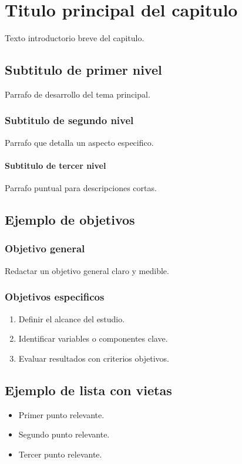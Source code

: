 
\chapter{Titulo principal del capitulo}
Texto introductorio breve del capitulo.

\section{Subtitulo de primer nivel}
Parrafo de desarrollo del tema principal.

\subsection{Subtitulo de segundo nivel}
Parrafo que detalla un aspecto especifico.

\subsubsection{Subtitulo de tercer nivel}
Parrafo puntual para descripciones cortas.

\section{Ejemplo de objetivos}
\subsection*{Objetivo general}
Redactar un objetivo general claro y medible.

\subsection*{Objetivos especificos}
\begin{enumerate}
  \item Definir el alcance del estudio.
  \item Identificar variables o componentes clave.
  \item Evaluar resultados con criterios objetivos.
\end{enumerate}

\section{Ejemplo de lista con vietas}
\begin{itemize}
  \item Primer punto relevante.
  \item Segundo punto relevante.
  \item Tercer punto relevante.
\end{itemize}

